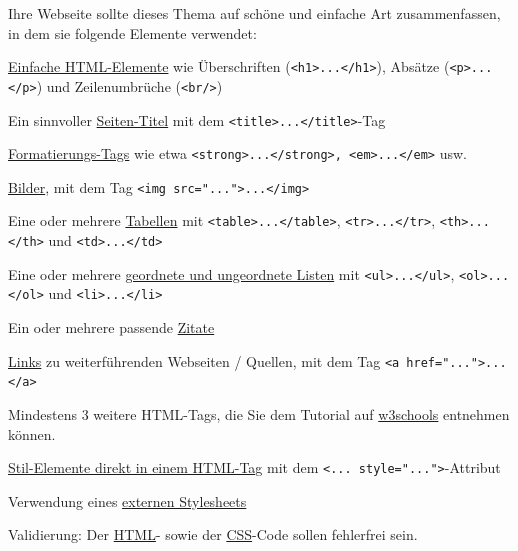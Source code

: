 Ihre Webseite sollte dieses Thema auf schöne und einfache Art zusammenfassen, in dem sie folgende Elemente verwendet:
\begin{todolist}
    \item \href{https://www.w3schools.com/html/html_basic.asp}{Einfache HTML-Elemente} wie Überschriften (\lstinline|<h1>...</h1>|), Absätze (\lstinline|<p>...</p>|) und Zeilenumbrüche (\lstinline|<br/>|)
    \item Ein sinnvoller \href{https://www.w3schools.com/html/html_page_title.asp}{Seiten-Titel} mit dem \lstinline|<title>...</title>|-Tag
    \item \href{https://www.w3schools.com/html/html_formatting.asp}{Formatierungs-Tags} wie etwa \lstinline|<strong>...</strong>, <em>...</em>| usw.
    \item \href{https://www.w3schools.com/html/html_images.asp}{Bilder}, mit dem Tag \lstinline|<img src="...">...</img>|
    \item Eine oder mehrere \href{https://www.w3schools.com/html/html_tables.asp}{Tabellen} mit \lstinline|<table>...</table>|, \lstinline|<tr>...</tr>|, \lstinline|<th>...</th>| und \lstinline|<td>...</td>|
    \item Eine oder mehrere \href{https://www.w3schools.com/html/html_lists.asp}{geordnete und ungeordnete Listen} mit \lstinline|<ul>...</ul>|, \lstinline|<ol>...</ol>| und \lstinline|<li>...</li>|
    \item Ein oder mehrere passende \href{https://www.w3schools.com/html/html_quotation_elements.asp}{Zitate}
    \item \href{https://www.w3schools.com/html/html_links.asp}{Links}  zu weiterführenden Webseiten / Quellen, mit dem Tag \lstinline|<a href="...">...</a>|
    \item Mindestens 3 weitere HTML-Tags, die Sie dem Tutorial auf \href{https://www.w3schools.com/html/html_quotation_elements.asp}{w3schools} entnehmen können.
    \item \href{https://www.w3schools.com/html/html_styles.asp}{Stil-Elemente direkt in einem HTML-Tag} mit dem \lstinline|<... style="...">|-Attribut
    \item Verwendung eines \href{https://www.w3schools.com/html/html_css.asp}{externen Stylesheets}
    \item Validierung: Der \href{https://validator.w3.org/nu/#textarea}{HTML}- sowie der \href{https://jigsaw.w3.org/css-validator/#validate_by_input}{CSS}-Code sollen fehlerfrei sein.
\end{todolist}

